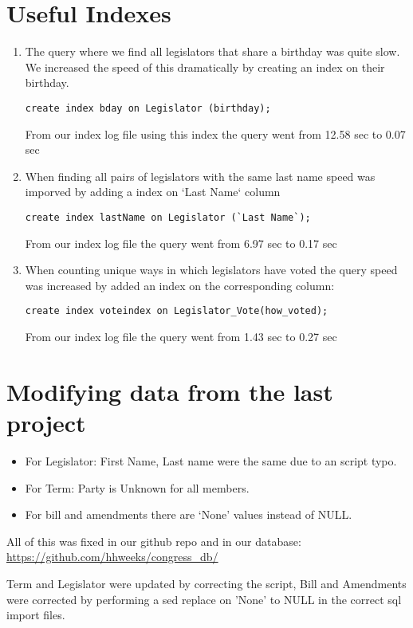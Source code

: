 \documentclass[11pt]{article}
\begin{document}
\section{Useful Indexes}
\label{sec-3}

\begin{enumerate}
\item The query where we find all legislators that share a birthday was quite slow.
We increased the speed of this dramatically by creating an index on their birthday.
\begin{verbatim}
create index bday on Legislator (birthday);
\end{verbatim}
From our index log file using this index the query went from 12.58 sec to 0.07 sec

\item When finding all pairs of legislators with the same last name speed was
imporved by adding a index on `Last Name` column
\begin{verbatim}
create index lastName on Legislator (`Last Name`);
\end{verbatim}
From our index log file the query went from 6.97 sec to 0.17 sec

\item When counting unique ways in which legislators have voted the query speed
was increased by added an index on the corresponding column:
\begin{verbatim}
create index voteindex on Legislator_Vote(how_voted);
\end{verbatim}
From our index log file the query went from 1.43 sec to 0.27 sec
\end{enumerate}

\section{Modifying data from the last project}
\label{sec-4}

\begin{itemize}
\item For Legislator: First Name, Last name were the same due to an script typo.

\item For Term: Party is Unknown for all members.

\item For bill and amendments there are ‘None’ values instead of NULL.
\end{itemize}

All of this was fixed in our github repo and in our database: \url{https://github.com/hhweeks/congress_db/}

Term and Legislator were updated by correcting the script, Bill and Amendments were corrected by
performing a sed replace on 'None' to NULL in the correct sql import files.
\end{document}
